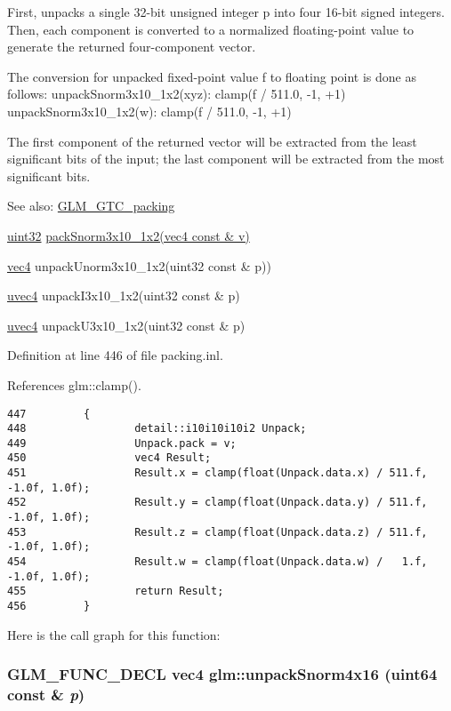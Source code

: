 First, unpacks a single 32-bit unsigned integer p into four 16-bit signed integers. Then, each component is converted to a normalized floating-point value to generate the returned four-component vector.

The conversion for unpacked fixed-point value f to floating point is done as follows: unpackSnorm3x10\_\-1x2(xyz): clamp(f / 511.0, -1, +1) unpackSnorm3x10\_\-1x2(w): clamp(f / 511.0, -1, +1)

The first component of the returned vector will be extracted from the least significant bits of the input; the last component will be extracted from the most significant bits.

\begin{Desc}
\item[See also:]\hyperlink{group__gtc__packing}{GLM\_\-GTC\_\-packing} 

\hyperlink{group__gtc__type__precision_g202b6a53c105fcb7e531f9b443518451}{uint32} \hyperlink{group__gtc__packing_g0d4157cec37c0312216a7be1cc92df54}{packSnorm3x10\_\-1x2(vec4 const \& v)} 

\hyperlink{group__core__types_g5881b1b022d7fd1b7218f5916532dd02}{vec4} unpackUnorm3x10\_\-1x2(uint32 const \& p)) 

\hyperlink{group__core__types_g1c426d19627b32b14f0089f7f4ba7b1d}{uvec4} unpackI3x10\_\-1x2(uint32 const \& p) 

\hyperlink{group__core__types_g1c426d19627b32b14f0089f7f4ba7b1d}{uvec4} unpackU3x10\_\-1x2(uint32 const \& p) \end{Desc}


Definition at line 446 of file packing.inl.

References glm::clamp().

\begin{Code}\begin{verbatim}447         {
448                 detail::i10i10i10i2 Unpack;
449                 Unpack.pack = v;
450                 vec4 Result;
451                 Result.x = clamp(float(Unpack.data.x) / 511.f, -1.0f, 1.0f);
452                 Result.y = clamp(float(Unpack.data.y) / 511.f, -1.0f, 1.0f);
453                 Result.z = clamp(float(Unpack.data.z) / 511.f, -1.0f, 1.0f);
454                 Result.w = clamp(float(Unpack.data.w) /   1.f, -1.0f, 1.0f);
455                 return Result;
456         }
\end{verbatim}
\end{Code}




Here is the call graph for this function:\hypertarget{group__gtc__packing_gdb01fc0530f07beb509c89d97b6f4d20}{
\subsubsection[unpackSnorm4x16]{\setlength{\rightskip}{0pt plus 5cm}GLM\_\-FUNC\_\-DECL vec4 glm::unpackSnorm4x16 (uint64 const \& {\em p})}}
\label{group__gtc__packing_gdb01fc0530f07beb509c89d97b6f4d20}



